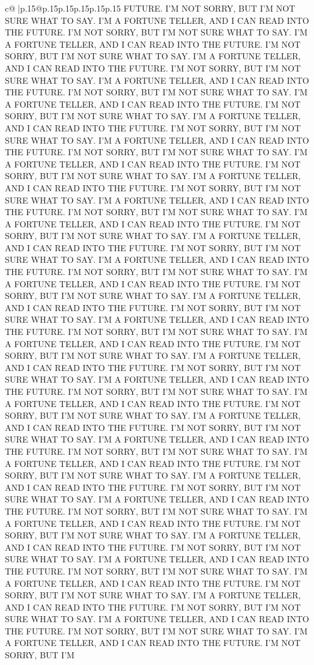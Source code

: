 \documentclass{article}
\begin{document}
{\begin{supertabular}{c@{$\;$}|p{.15\linewidth}@{}p{.15\linewidth}p{.15\linewidth}p{.15\linewidth}p{.15\linewidth}p{.15\linewidth}}
{{{FUTURE. I'M NOT SORRY, BUT I'M NOT SURE WHAT TO SAY. I'M A FORTUNE TELLER, AND I CAN READ INTO THE FUTURE. I'M NOT SORRY, BUT I'M NOT SURE WHAT TO SAY. I'M A FORTUNE TELLER, AND I CAN READ INTO THE FUTURE. I'M NOT SORRY, BUT I'M NOT SURE WHAT TO SAY. I'M A FORTUNE TELLER, AND I CAN READ INTO THE FUTURE. I'M NOT SORRY, BUT I'M NOT SURE WHAT TO SAY. I'M A FORTUNE TELLER, AND I CAN READ INTO THE FUTURE. I'M NOT SORRY, BUT I'M NOT SURE WHAT TO SAY. I'M A FORTUNE TELLER, AND I CAN READ INTO THE FUTURE. I'M NOT SORRY, BUT I'M NOT SURE WHAT TO SAY. I'M A FORTUNE TELLER, AND I CAN READ INTO THE FUTURE. I'M NOT SORRY, BUT I'M NOT SURE WHAT TO SAY. I'M A FORTUNE TELLER, AND I CAN READ INTO THE FUTURE. I'M NOT SORRY, BUT I'M NOT SURE WHAT TO SAY. I'M A FORTUNE TELLER, AND I CAN READ INTO THE FUTURE. I'M NOT SORRY, BUT I'M NOT SURE WHAT TO SAY. I'M A FORTUNE TELLER, AND I CAN READ INTO THE FUTURE. I'M NOT SORRY, BUT I'M NOT SURE WHAT TO SAY. I'M A FORTUNE TELLER, AND I CAN READ INTO THE FUTURE. I'M NOT SORRY, BUT I'M NOT SURE WHAT TO SAY. I'M A FORTUNE TELLER, AND I CAN READ INTO THE FUTURE. I'M NOT SORRY, BUT I'M NOT SURE WHAT TO SAY. I'M A FORTUNE TELLER, AND I CAN READ INTO THE FUTURE. I'M NOT SORRY, BUT I'M NOT SURE WHAT TO SAY. I'M A FORTUNE TELLER, AND I CAN READ INTO THE FUTURE. I'M NOT SORRY, BUT I'M NOT SURE WHAT TO SAY. I'M A FORTUNE TELLER, AND I CAN READ INTO THE FUTURE. I'M NOT SORRY, BUT I'M NOT SURE WHAT TO SAY. I'M A FORTUNE TELLER, AND I CAN READ INTO THE FUTURE. I'M NOT SORRY, BUT I'M NOT SURE WHAT TO SAY. I'M A FORTUNE TELLER, AND I CAN READ INTO THE FUTURE. I'M NOT SORRY, BUT I'M NOT SURE WHAT TO SAY. I'M A FORTUNE TELLER, AND I CAN READ INTO THE FUTURE. I'M NOT SORRY, BUT I'M NOT SURE WHAT TO SAY. I'M A FORTUNE TELLER, AND I CAN READ INTO THE FUTURE. I'M NOT SORRY, BUT I'M NOT SURE WHAT TO SAY. I'M A FORTUNE TELLER, AND I CAN READ INTO THE FUTURE. I'M NOT SORRY, BUT I'M NOT SURE WHAT TO SAY. I'M A FORTUNE TELLER, AND I CAN READ INTO THE FUTURE. I'M NOT SORRY, BUT I'M NOT SURE WHAT TO SAY. I'M A FORTUNE TELLER, AND I CAN READ INTO THE FUTURE. I'M NOT SORRY, BUT I'M NOT SURE WHAT TO SAY. I'M A FORTUNE TELLER, AND I CAN READ INTO THE FUTURE. I'M NOT SORRY, BUT I'M NOT SURE WHAT TO SAY. I'M A FORTUNE TELLER, AND I CAN READ INTO THE FUTURE. I'M NOT SORRY, BUT I'M NOT SURE WHAT TO SAY. I'M A FORTUNE TELLER, AND I CAN READ INTO THE FUTURE. I'M NOT SORRY, BUT I'M NOT SURE WHAT TO SAY. I'M A FORTUNE TELLER, AND I CAN READ INTO THE FUTURE. I'M NOT SORRY, BUT I'M NOT SURE WHAT TO SAY. I'M A FORTUNE TELLER, AND I CAN READ INTO THE FUTURE. I'M NOT SORRY, BUT I'M NOT SURE WHAT TO SAY. I'M A FORTUNE TELLER, AND I CAN READ INTO THE FUTURE. I'M NOT SORRY, BUT I'M NOT SURE WHAT TO SAY. I'M A FORTUNE TELLER, AND I CAN READ INTO THE FUTURE. I'M NOT SORRY, BUT I'M NOT SURE WHAT TO SAY. I'M A FORTUNE TELLER, AND I CAN READ INTO THE FUTURE. I'M NOT SORRY, BUT I'M NOT SURE WHAT TO SAY. I'M A FORTUNE TELLER, AND I CAN READ INTO THE FUTURE. I'M NOT SORRY, BUT I'M NOT SURE WHAT TO SAY. I'M A FORTUNE TELLER, AND I CAN READ INTO THE FUTURE. I'M NOT SORRY, BUT I'M NOT SURE WHAT TO SAY. I'M A FORTUNE TELLER, AND I CAN READ INTO THE FUTURE. I'M NOT SORRY, BUT I'M }}}
\end{supertabular}}
\end{document}
